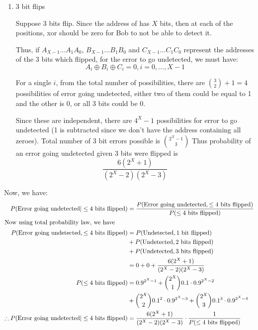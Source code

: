 \documentclass[12pt, oneside]{article}
\begin{document}
\begin{enumerate}
{\begin{enumerate}
{            Suppose two bits in distinct locations flip. If Bob were to not be able to
            detect them, the xor of the location of both these bits would be 0.
            But \(A \oplus B = 0 \implies A = B\) which contradicts our assumption.
            Thus the result would be non-zero and be detected by Bob with complete
            certainty.
        }
        \item {
            3 bit flips

            Suppose 3 bits flip. Since the address of has \(X\) bits, then at each of
            the positions, xor should be zero for Bob to not be able to detect it.

            Thus, if \(A_{X-1}\ldots A_{1}A_{0}\), \(B_{X-1}\ldots B_{1}B_{0}\) and
            \(C_{X-1}\ldots C_{1}C_{0}\) represent the addresses of the 3 bits which
            flipped, for the error to go undetected, we must have:
            \[A_i \oplus B_i \oplus C_i = 0, i = 0, \ldots, X - 1\]

            For a single \(i\), from the total number of possibilities, there are
            \({3 \choose 2} + 1 = 4\) possibilities of error going undetected, either two
            of them could be equal to 1 and the other is 0, or all 3 bits could be 0.

            Since these are independent, there are \(4^X - 1\) possibilities for error
            to go undetected (1 is subtracted since we don't have the address containing
            all zeroes). Total number of 3 bit errors possible is \({2^X - 1} \choose 3\)
            Thus probability of an error going undetected given 3 bits were flipped is
            \[\frac{6(2^X + 1)}{(2^X - 2)(2^X - 3)}\]
        }
    \end{enumerate}

    Now, we have:
    \begin{align*}
        P(\text{Error going undetected} | \leq 4 \text{ bits flipped}) &=
            \frac{P(\text{Error going undetected}, \leq 4 \text{ bits flipped})}{P(\leq 4 \text{ bits flipped})} \\
            \intertext{Now using total probability law, we have}
            P(\text{Error going undetected}, \leq 4 \text{ bits flipped}) &=
                P(\text{Undetected}, 1 \text{ bit flipped}) \\
                &+ P(\text{Undetected}, 2 \text{ bits flipped}) \\
                &+ P(\text{Undetected}, 3 \text{ bits flipped}) \\
                &= 0 + 0 + \frac{6(2^X + 1)}{(2^X - 2)(2^X - 3)} \\
        P(\leq 4 \text{ bits flipped}) &= 0.9^{2^X-1} + {2^X \choose 1}0.1\cdot0.9^{2^X - 2} \\
                                    &+ {2^X \choose 2}0.1^2\cdot0.9^{2^X - 3} + {2^X \choose 3}0.1^3\cdot0.9^{2^X - 4} \\
        \therefore P(\text{Error going undetected} | \leq 4 \text{ bits flipped})
            &= \frac{6(2^X + 1)}{(2^X - 2)(2^X - 3)} \cdot \frac{1}{P(\leq 4 \text{ bits flipped})}
    \end{align*}
}



\end{enumerate}
\end{document}
